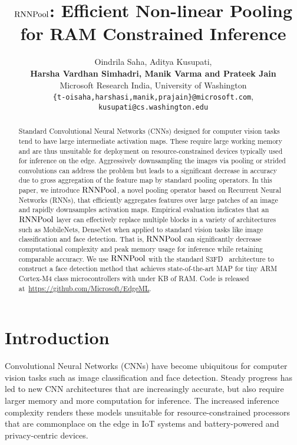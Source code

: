 \documentclass[10pt]{article}
\newcommand{\rpool}{\ensuremath{{\rm RNNPool}}\xspace}
\begin{document}
\title{\rpool: Efficient Non-linear Pooling for RAM Constrained Inference}
\author{
Oindrila Saha, Aditya Kusupati, \\\textbf{Harsha Vardhan Simhadri, Manik Varma and Prateek Jain}\\
Microsoft Research India, 
University of Washington\\
\texttt{\{t-oisaha,harshasi,manik,prajain\}@microsoft.com}, \texttt{kusupati@cs.washington.edu}
}


\maketitle
\begin{abstract}
Standard Convolutional Neural Networks (CNNs) designed for computer
vision tasks tend to have large intermediate activation maps. These
require large working memory and are thus unsuitable for deployment on
resource-constrained devices typically used for inference on the
edge. Aggressively downsampling the images via pooling or strided
convolutions can address the problem but leads to a significant
decrease in accuracy due to gross aggregation of the feature map by
standard pooling operators. In this paper, we introduce \rpool, a
novel pooling operator based on Recurrent Neural Networks (RNNs), that
efficiently aggregates features over large patches of an image and
rapidly downsamples activation maps.  Empirical evaluation indicates
that an \rpool layer can effectively replace multiple blocks in a
variety of architectures such as
MobileNets,
DenseNet when applied to standard vision
tasks like image classification and face detection. That is, \rpool
can significantly decrease computational complexity and peak memory
usage for inference while retaining comparable accuracy. We use \rpool
with the standard S3FD~\citep{zhang2017s3fd} architecture to construct
a face detection method that achieves state-of-the-art MAP for tiny
ARM Cortex-M4 class microcontrollers with under  KB of
RAM. Code is released at~\url{https://github.com/Microsoft/EdgeML}.
\end{abstract}
  \section{Introduction}
\label{sec:intro}

Convolutional Neural Networks (CNNs) have become ubiquitous for
computer vision tasks such as image classification and face
detection. Steady progress has led to new CNN architectures that are
increasingly accurate, but also require larger memory and more
computation for inference. The increased inference complexity renders
these models unsuitable for resource-constrained processors that are
commonplace on the edge in IoT systems and battery-powered and
privacy-centric devices.
\end{document}
